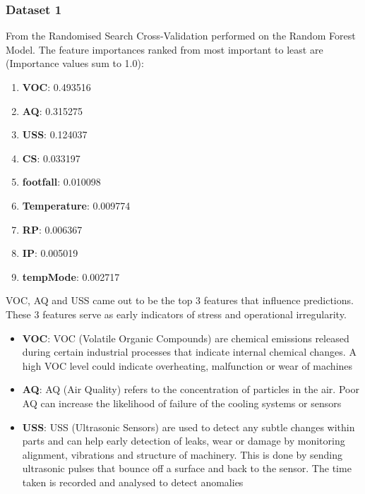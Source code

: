 \documentclass[11pt]{article}
\begin{document}
\subsubsection{Dataset 1}
From the Randomised Search Cross-Validation performed on the Random Forest Model. The feature importances ranked from most important to least are (Importance values sum to 1.0):

\begin{enumerate}
    \item \textbf{VOC}: 0.493516
    \item \textbf{AQ}: 0.315275
    \item \textbf{USS}: 0.124037
    \item \textbf{CS}: 0.033197
    \item \textbf{footfall}: 0.010098
    \item \textbf{Temperature}: 0.009774
    \item \textbf{RP}: 0.006367
    \item \textbf{IP}: 0.005019
    \item \textbf{tempMode}: 0.002717
\end{enumerate}



VOC, AQ and USS came out to be the top 3 features that influence predictions. These 3 features serve as early indicators of stress and operational irregularity.    

\begin{itemize}
    \item \textbf{VOC}: VOC (Volatile Organic Compounds) are chemical emissions released during certain industrial processes that indicate internal chemical changes. A high VOC level could indicate overheating, malfunction or wear of machines \cite{yang2025randomforest} \cite{hong2023varnish}
    \item \textbf{AQ}: AQ (Air Quality) refers to the concentration of particles in the air. Poor AQ can increase the likelihood of failure of the cooling systems or sensors \cite{saini2021contaminants}
    \item \textbf{USS}: USS (Ultrasonic Sensors) are used to detect any subtle changes within parts and can help early detection of leaks, wear or damage by monitoring alignment, vibrations and structure of machinery. This is done by sending ultrasonic pulses that bounce off a surface and back to the sensor. The time taken is recorded and analysed to detect anomalies \cite{mobki2023ultrasound}
\end{itemize}
\end{document}
